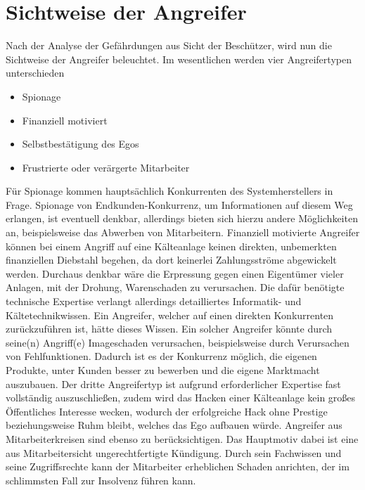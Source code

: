 \documentclass[11pt,a4paper]{report}
\begin{document}
\section{Sichtweise der Angreifer} \label{sec:attackers}

Nach der Analyse der Gefährdungen aus Sicht der Beschützer, wird nun die Sichtweise der Angreifer beleuchtet. Im wesentlichen werden vier Angreifertypen unterschieden \cite[s.~256]{gutmann}\cite{emp_sabo}

\begin{itemize}[leftmargin=*]
\item Spionage
\item Finanziell motiviert
\item Selbstbestätigung des Egos
\item Frustrierte oder verärgerte Mitarbeiter
\end{itemize}

Für Spionage kommen hauptsächlich Konkurrenten des Systemherstellers in Frage. Spionage von Endkunden-Konkurrenz, um Informationen auf diesem Weg erlangen, ist eventuell denkbar, allerdings bieten sich hierzu andere Möglichkeiten an, beispielsweise das Abwerben von Mitarbeitern. Finanziell motivierte Angreifer können bei einem Angriff auf eine Kälteanlage keinen direkten, unbemerkten finanziellen Diebstahl begehen, da dort keinerlei Zahlungsströme abgewickelt werden. Durchaus denkbar wäre die Erpressung gegen einen Eigentümer vieler Anlagen, mit der Drohung, Warenschaden zu verursachen. Die dafür benötigte technische Expertise verlangt allerdings detailliertes Informatik- und Kältetechnikwissen. Ein Angreifer, welcher auf einen direkten Konkurrenten zurückzuführen ist, hätte dieses Wissen. Ein solcher Angreifer könnte durch seine(n) Angriff(e) Imageschaden verursachen, beispielsweise durch Verursachen von Fehlfunktionen. Dadurch ist es der Konkurrenz möglich, die eigenen Produkte, unter Kunden besser zu bewerben und die eigene Marktmacht auszubauen. Der dritte Angreifertyp ist aufgrund erforderlicher Expertise fast vollständig auszuschließen, zudem wird das Hacken einer Kälteanlage kein großes Öffentliches Interesse wecken, wodurch der erfolgreiche Hack ohne Prestige beziehungsweise Ruhm bleibt, welches das Ego aufbauen würde. Angreifer aus Mitarbeiterkreisen sind ebenso zu berücksichtigen. Das Hauptmotiv dabei ist eine aus Mitarbeitersicht ungerechtfertigte Kündigung. Durch sein Fachwissen und seine Zugriffsrechte kann der Mitarbeiter erheblichen Schaden anrichten, der im schlimmsten Fall zur Insolvenz führen kann.
\end{document}
